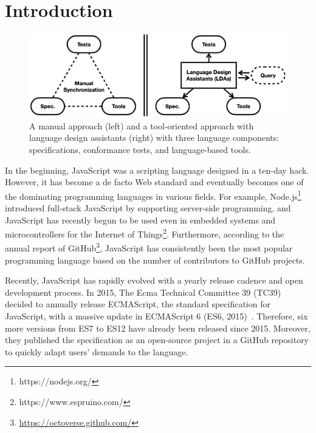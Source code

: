 \section{Introduction}\label{sec:intro}

\begin{figure}
  \centering
  \includegraphics[width=\columnwidth]{img/lda.png}
  \caption{A manual approach (left) and a tool-oriented approach with language
    design assistants (right) with three language components: specifications,
  conformance tests, and language-based tools.}
  \label{fig:lda}
  \vspace*{-.5em}
\end{figure}

In the beginning, JavaScript was a scripting language designed in a ten-day
hack. However, it has become a de facto Web standard and eventually becomes one
of the dominating programming languages in various fields. For example,
Node.js\footnote{https://nodejs.org/} introduced full-stack JavaScript by
supporting server-side programming, and JavaScript has recently begun to be used
even in embedded systems and microcontrollers for the Internet of
Things\footnote{https://www.espruino.com/}. Furthermore, according to the annual
report of GitHub\footnote{\url{https://octoverse.github.com/}}, JavaScript has
consistently been the most popular programming language based on the number of
contributors to GitHub projects.

Recently, JavaScript has rapidly evolved with a yearly release cadence and open
development process. In 2015, The Ecma Technical Committee 39 (TC39) decided to
annually release ECMAScript, the standard specification for JavaScript, with a
massive update in ECMAScript 6 (ES6, 2015)~\cite{es6}. Therefore, six more
versions from ES7 to ES12 have already been released since 2015. Moreover, they
published the specification as an open-source project in a GitHub repository to
quickly adapt users' demands to the language.

